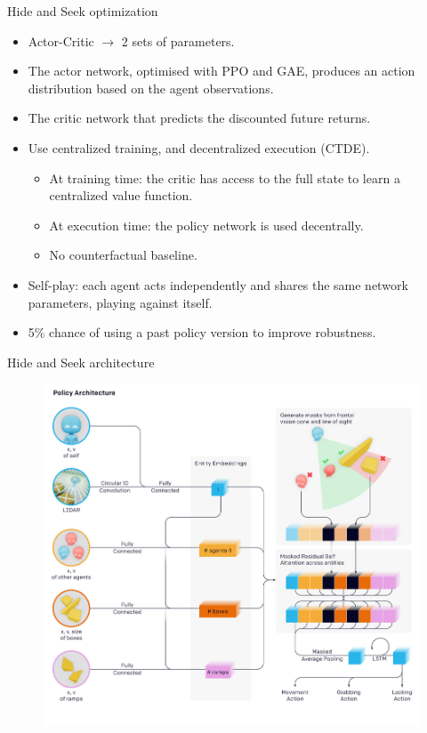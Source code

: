 \documentclass[9pt, hyperref={pdfusetitle,colorlinks=true,allcolors=DarkBlue}]{beamer}
\begin{document}
\begin{frame}{Hide and Seek optimization}
    \begin{itemize}
        \item Actor-Critic $\rightarrow$ 2 sets of parameters.
        \item The actor network, optimised with PPO and GAE, produces an action distribution based on the agent observations.
        \item The critic network that predicts the discounted future returns.
        \item Use centralized training, and decentralized execution (CTDE).
        \begin{itemize}
            \item At training time: the critic has access to the full state to learn a centralized value function.
            \item At execution time: the policy network is used decentrally.
            \item No counterfactual baseline.
        \end{itemize}{}
        \item Self-play: each agent acts independently and shares the same network parameters, playing against itself.
        \item 5\% chance of using a past policy version to improve robustness.
    \end{itemize}{}
\end{frame}{}

\begin{frame}{Hide and Seek architecture}
    \begin{figure}
    \centering
    \includegraphics[scale=0.25]{hasarch.png}
    \end{figure}
\end{frame}{}
\end{document}
